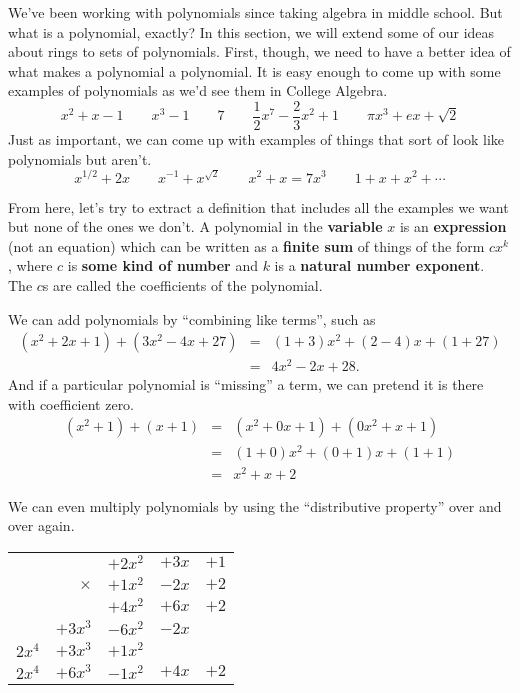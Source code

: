 We've been working with polynomials since taking algebra in middle school.
But what is a polynomial, exactly? In this section, we will extend some of our ideas about rings to sets of polynomials.
First, though, we need to have a better idea of what makes a polynomial a polynomial.
It is easy enough to come up with some examples of polynomials as we'd see them in College Algebra.
\[ x^2 + x - 1 \quad\quad x^3 - 1 \quad\quad 7 \quad\quad \frac{1}{2}x^7 - \frac{2}{3}x^2 + 1 \quad\quad \pi x^3 + e x + \sqrt{2} \]
Just as important, we can come up with examples of things that sort of look like polynomials but aren't.
\[ x^{1/2} + 2x \quad\quad x^{-1} + x^{\sqrt{2}} \quad\quad x^2 + x = 7x^3  \quad\quad 1 + x + x^2 + \cdots \]

From here, let's try to extract a definition that includes all the examples we want but none of the ones we don't.
A polynomial in the \textbf{variable} \(x\) is an \textbf{expression} (not an equation) which can be written as a \textbf{finite sum} of things of the form \(cx^k\), where \(c\) is \textbf{some kind of number} and \(k\) is a \textbf{natural number exponent}.
The \(c\)s are called the coefficients of the polynomial.

We can add polynomials by ``combining like terms'', such as
\begin{eqnarray*}
(x^2 + 2x + 1) + (3x^2 - 4x + 27) & = & (1+3)x^2 + (2 - 4)x + (1 + 27) \\
 & = & 4x^2 - 2x + 28.
\end{eqnarray*}
And if a particular polynomial is ``missing'' a term, we can pretend it is there with coefficient zero.
\begin{eqnarray*}
(x^2 + 1) + (x + 1) & = & (x^2 + 0x + 1) + (0x^2 + x + 1) \\
 & = & (1+0)x^2 + (0+1)x + (1+1) \\
 & = & x^2 + x + 2
\end{eqnarray*}

We can even multiply polynomials by using the ``distributive property'' over and over again.

\begin{center}
\begin{tabular}{rrrrr}
         &            & \(+2x^2\) & \(+3x\) & \(+1\) \\
         & \(\times\) & \(+1x^2\) & \(-2x\) & \(+2\) \\ \hline
         &            & \(+4x^2\) & \(+6x\) & \(+2\) \\
         & \(+3x^3\)  & \(-6x^2\) & \(-2x\) &        \\
\(2x^4\) & \(+3x^3\)  & \(+1x^2\) &         &        \\ \hline
\(2x^4\) & \(+6x^3\)  & \(-1x^2\) & \(+4x\) & \(+2\)
\end{tabular}
\end{center}

